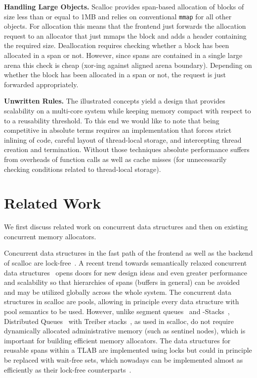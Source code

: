 \documentclass[10pt]{sigplanconf}
\newcommand{\OurSubsubsection}[1]{\smallbreak\noindent\textbf{#1}\xspace}
\newcommand{\impl}[1]{{\tt #1}\xspace}
\begin{document}
\OurSubsubsection{Handling Large Objects.}
Scalloc provides span-based allocation of blocks of size less than or equal to
1MB and relies on conventional \impl{mmap} for all other objects. For allocation
this means that the frontend just forwards the allocation request to an
allocator that just mmaps the block and adds a header containing the required
size. Deallocation requires checking whether a block has been allocated in a
span or not. However, since spans are contained in a single large arena this
check is cheap (xor-ing against aligned arena boundary). Depending on whether
the block has been allocated in a span or not, the request is just forwarded
appropriately.

\OurSubsubsection{Unwritten Rules.}
The illustrated concepts yield a design that provides scalability on a
multi-core system while keeping memory compact with respect to to a reusability threshold.
To this end we would like to note that being competitive in absolute terms
requires an implementation that forces strict inlining of code, careful
layout of thread-local storage, and intercepting thread creation and
termination. Without those techniques absolute performance suffers from
overheads of  function calls as well as cache misses (for unnecessarily checking
conditions related to thread-local storage).


\section{Related Work}\label{sec:related-work}

We first discuss related work on concurrent data structures and then on existing
concurrent memory allocators.

Concurrent data structures in the fast path of the frontend as well as the
backend of scalloc are lock-free~\cite{Herlihy08}. A recent trend towards semantically
relaxed concurrent data structures~\cite{Afek:OPODIS10, Henzinger:POPL13} opens
doors for new design ideas and even greater performance and scalability so that
hierarchies of spans (buffers in general) can be avoided and may be utilized
globally across the whole system. The concurrent data structures in scalloc are
pools, allowing in principle every data structure with pool semantics to be
used. However, unlike segment queues~\cite{Afek:OPODIS10} and -Stacks~\cite{Henzinger:POPL13}, Distributed Queues~\cite{Haas:CF13} with Treiber
stacks~\cite{Treiber86}, as used in scalloc, do not require dynamically
allocated administrative memory (such as sentinel nodes), which is important for
building efficient memory allocators. The data structures for reusable spans within a TLAB 
are implemented using locks but could in principle be replaced with 
wait-free sets, which nowadays can be implemented almost as efficiently
as their lock-free counterparts~\cite{Kogan:PPoPP12}.
\end{document}
